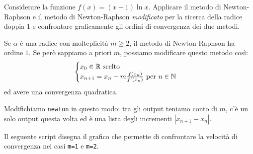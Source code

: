 \begin{esercizio}
Considerare la funzione \(f(x) = (x-1)\ln x\). Applicare il metodo di \textenglish{Newton-Raphson} e il metodo di \textenglish{Newton-Raphson} {\em modificato} per la ricerca della radice doppia \(1\) e confrontare graficamente gli ordini di convergenza dei due metodi.
\end{esercizio}

Se \(\alpha\) è una radice con molteplicità \(m \ge 2\), il metodo di \textenglish{Newton-Raphson} ha ordine \(1\). Se però sappiamo a priori \(m\), possiamo modificare questo metodo così:
\[\begin{cases} x_0 \in \mathbb R \text{ scelto} \\ x_{n+1} = x_n - m\frac{f(x_n)}{f^\prime (x_n)} \text{ per } n \in \mathbb N \end{cases}\]
ed avere una convergenza quadratica.

Modifichiamo \lstinline£newton£ in questo modo: tra gli output teniamo conto di \(m\), c'è un solo output questa volta ed è una lista degli incrementi \(\left\lvert x_{n+1} - x_n \right\rvert\).



Il seguente script disegna il grafico che permette di confrontare la velocità di convergenza nei casi \lstinline£m=1£ e \lstinline£m=2£.


